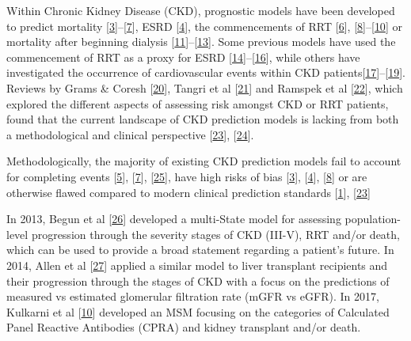 \documentclass[
]{article}
\begin{document}
Within Chronic Kidney Disease (CKD), prognostic models have been developed to predict mortality {[}\protect\hyperlink{ref-johnson_predicting_2007}{3}{]}--{[}\protect\hyperlink{ref-wick_clinical_2017}{7}{]}, ESRD {[}\protect\hyperlink{ref-landray_prediction_2010}{4}{]}, the commencements of RRT {[}\protect\hyperlink{ref-marks_looking_2015}{6}{]}, {[}\protect\hyperlink{ref-johnson_predicting_2008}{8}{]}--{[}\protect\hyperlink{ref-kulkarni_transition_2017}{10}{]} or mortality after beginning dialysis {[}\protect\hyperlink{ref-floege_development_2015}{11}{]}--{[}\protect\hyperlink{ref-cao_predicting_2015}{13}{]}. Some previous models have used the commencement of RRT as a proxy for ESRD {[}\protect\hyperlink{ref-tangri_predictive_2011}{14}{]}--{[}\protect\hyperlink{ref-tangri_dynamic_2017}{16}{]}, while others have investigated the occurrence of cardiovascular events within CKD patients{[}\protect\hyperlink{ref-shlipak_cardiovascular_2005}{17}{]}--{[}\protect\hyperlink{ref-mcmurray_predictors_2011}{19}{]}. Reviews by Grams \& Coresh {[}\protect\hyperlink{ref-grams_assessing_2013}{20}{]}, Tangri et al {[}\protect\hyperlink{ref-tangri_risk_2013}{21}{]} and Ramspek et al {[}\protect\hyperlink{ref-ramspek_prediction_2017}{22}{]}, which explored the different aspects of assessing risk amongst CKD or RRT patients, found that the current landscape of CKD prediction models is lacking from both a methodological and clinical perspective {[}\protect\hyperlink{ref-collins_transparent_2015}{23}{]}, {[}\protect\hyperlink{ref-bouwmeester_reporting_2012-1}{24}{]}.

Methodologically, the majority of existing CKD prediction models fail to account for completing events {[}\protect\hyperlink{ref-bansal_development_2015}{5}{]}, {[}\protect\hyperlink{ref-wick_clinical_2017}{7}{]}, {[}\protect\hyperlink{ref-perotte_risk_2015}{25}{]}, have high risks of bias {[}\protect\hyperlink{ref-johnson_predicting_2007}{3}{]}, {[}\protect\hyperlink{ref-landray_prediction_2010}{4}{]}, {[}\protect\hyperlink{ref-johnson_predicting_2008}{8}{]} or are otherwise flawed compared to modern clinical prediction standards {[}\protect\hyperlink{ref-steyerberg_prognosis_2013}{1}{]}, {[}\protect\hyperlink{ref-collins_transparent_2015}{23}{]}

In 2013, Begun et al {[}\protect\hyperlink{ref-begun_identification_2013}{26}{]} developed a multi-State model for assessing population-level progression through the severity stages of CKD (III-V), RRT and/or death, which can be used to provide a broad statement regarding a patient's future. In 2014, Allen et al {[}\protect\hyperlink{ref-allen_chronic_2014}{27}{]} applied a similar model to liver transplant recipients and their progression through the stages of CKD with a focus on the predictions of measured vs estimated glomerular filtration rate (mGFR vs eGFR). In 2017, Kulkarni et al {[}\protect\hyperlink{ref-kulkarni_transition_2017}{10}{]} developed an MSM focusing on the categories of Calculated Panel Reactive Antibodies (CPRA) and kidney transplant and/or death.
\end{document}
